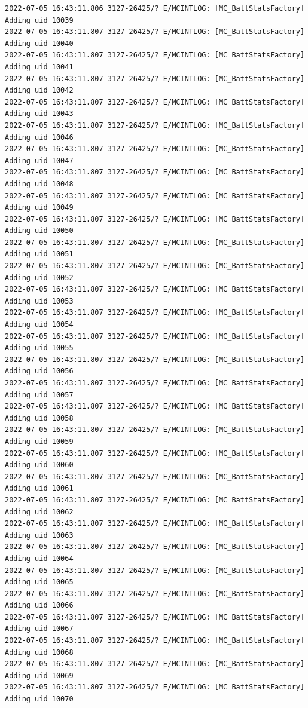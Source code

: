 \documentclass[a4paper,12pt]{book}
\begin{document}
\begin{lstlisting}
2022-07-05 16:43:11.806 3127-26425/? E/MCINTLOG: [MC_BattStatsFactory] Adding uid 10039
2022-07-05 16:43:11.807 3127-26425/? E/MCINTLOG: [MC_BattStatsFactory] Adding uid 10040
2022-07-05 16:43:11.807 3127-26425/? E/MCINTLOG: [MC_BattStatsFactory] Adding uid 10041
2022-07-05 16:43:11.807 3127-26425/? E/MCINTLOG: [MC_BattStatsFactory] Adding uid 10042
2022-07-05 16:43:11.807 3127-26425/? E/MCINTLOG: [MC_BattStatsFactory] Adding uid 10043
2022-07-05 16:43:11.807 3127-26425/? E/MCINTLOG: [MC_BattStatsFactory] Adding uid 10046
2022-07-05 16:43:11.807 3127-26425/? E/MCINTLOG: [MC_BattStatsFactory] Adding uid 10047
2022-07-05 16:43:11.807 3127-26425/? E/MCINTLOG: [MC_BattStatsFactory] Adding uid 10048
2022-07-05 16:43:11.807 3127-26425/? E/MCINTLOG: [MC_BattStatsFactory] Adding uid 10049
2022-07-05 16:43:11.807 3127-26425/? E/MCINTLOG: [MC_BattStatsFactory] Adding uid 10050
2022-07-05 16:43:11.807 3127-26425/? E/MCINTLOG: [MC_BattStatsFactory] Adding uid 10051
2022-07-05 16:43:11.807 3127-26425/? E/MCINTLOG: [MC_BattStatsFactory] Adding uid 10052
2022-07-05 16:43:11.807 3127-26425/? E/MCINTLOG: [MC_BattStatsFactory] Adding uid 10053
2022-07-05 16:43:11.807 3127-26425/? E/MCINTLOG: [MC_BattStatsFactory] Adding uid 10054
2022-07-05 16:43:11.807 3127-26425/? E/MCINTLOG: [MC_BattStatsFactory] Adding uid 10055
2022-07-05 16:43:11.807 3127-26425/? E/MCINTLOG: [MC_BattStatsFactory] Adding uid 10056
2022-07-05 16:43:11.807 3127-26425/? E/MCINTLOG: [MC_BattStatsFactory] Adding uid 10057
2022-07-05 16:43:11.807 3127-26425/? E/MCINTLOG: [MC_BattStatsFactory] Adding uid 10058
2022-07-05 16:43:11.807 3127-26425/? E/MCINTLOG: [MC_BattStatsFactory] Adding uid 10059
2022-07-05 16:43:11.807 3127-26425/? E/MCINTLOG: [MC_BattStatsFactory] Adding uid 10060
2022-07-05 16:43:11.807 3127-26425/? E/MCINTLOG: [MC_BattStatsFactory] Adding uid 10061
2022-07-05 16:43:11.807 3127-26425/? E/MCINTLOG: [MC_BattStatsFactory] Adding uid 10062
2022-07-05 16:43:11.807 3127-26425/? E/MCINTLOG: [MC_BattStatsFactory] Adding uid 10063
2022-07-05 16:43:11.807 3127-26425/? E/MCINTLOG: [MC_BattStatsFactory] Adding uid 10064
2022-07-05 16:43:11.807 3127-26425/? E/MCINTLOG: [MC_BattStatsFactory] Adding uid 10065
2022-07-05 16:43:11.807 3127-26425/? E/MCINTLOG: [MC_BattStatsFactory] Adding uid 10066
2022-07-05 16:43:11.807 3127-26425/? E/MCINTLOG: [MC_BattStatsFactory] Adding uid 10067
2022-07-05 16:43:11.807 3127-26425/? E/MCINTLOG: [MC_BattStatsFactory] Adding uid 10068
2022-07-05 16:43:11.807 3127-26425/? E/MCINTLOG: [MC_BattStatsFactory] Adding uid 10069
2022-07-05 16:43:11.807 3127-26425/? E/MCINTLOG: [MC_BattStatsFactory] Adding uid 10070

\end{lstlisting}
\end{document}
